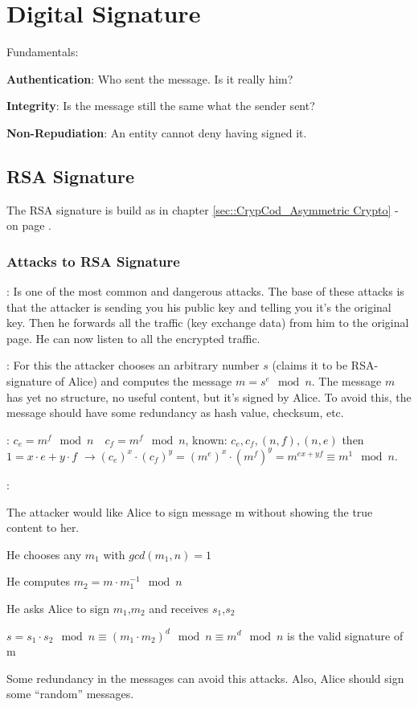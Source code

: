 
\section{Digital Signature}
Fundamentals:
\begin{liste}
  \item	\textbf{Authentication}: Who sent the message. Is it really him?
  \item \textbf{Integrity}: Is the message still the same what the sender sent?
  \item \textbf{Non-Repudiation}: An entity cannot deny having signed it.
\end{liste}


\subsection{RSA  Signature}
The RSA signature is build as in chapter \ref{sec::CrypCod_Asymmetric Crypto} -  on page \pageref{sec::CrypCod_Asymmetric Crypto}.

\subsubsection{Attacks to RSA Signature}

: 
Is one of the most common and dangerous attacks. The base of these attacks is that the attacker is sending you his public key and telling you it's the original key.
Then he forwards all the traffic (key exchange data) from him to the original page. 
He can now listen to all the encrypted traffic.

: For this the attacker chooses an arbitrary number $s$ (claims it to be RSA-signature of Alice) and computes the message $m=s^e\mod n$.
The message $m$ has yet no structure, no useful content, but it's signed by Alice.
To avoid this, the message should have some redundancy as hash value, checksum, etc.

: $c_e=m^f \mod n \quad c_f=m^f \mod n$, known: $c_e,c_f,(n,f),(n,e)$ then $1=x \cdot e + y \cdot f$
$\rightarrow (c_e)^x \cdot (c_f)^y=(m^e)^x \cdot (m^f)^y=m^{ex+yf} \equiv m^1 \mod n$.

:
\begin{aufzaehlung}
\item The attacker would like Alice to sign message m without showing the true content to her.
\item He chooses any $m_1$ with $gcd(m_1,n)=1$
\item He computes $m_2 = m \cdot m_1^{-1} \mod n$
\item He asks Alice to sign $m_1$,$m_2$ and receives $s_1$,$s_2$
\item $s=s_1 \cdot s_2 \mod n \equiv (m_1\cdot m_2)^d \mod n \equiv m^d \mod n$ is the valid signature of m
\end{aufzaehlung}
Some redundancy in the messages can avoid this attacks.
Also, Alice should sign some ``random'' messages.

